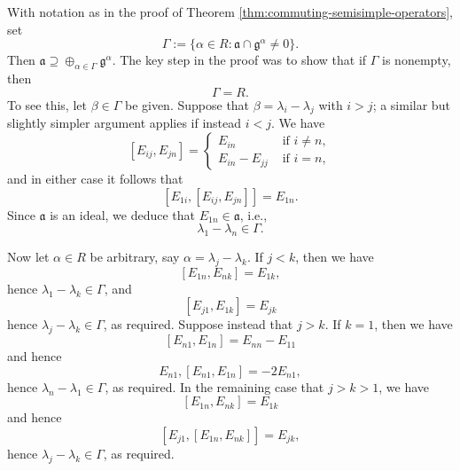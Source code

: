 \documentclass[reqno]{amsart} 
\begin{document}
With notation as in the proof of Theorem \ref{thm:commuting-semisimple-operators}, set 
\begin{equation*}
 \Gamma := \{\alpha \in R : \mathfrak{a} \cap \mathfrak{g}^\alpha \neq 0 \}.
\end{equation*}
Then $\mathfrak{a} \supseteq \oplus_{\alpha \in \Gamma} \mathfrak{g}^\alpha$.  The key step in the proof was to show that if $\Gamma$ is nonempty, then
\begin{equation}\label{eq:gamma-equals-R}
  \Gamma = R.
\end{equation}
To see this, let $\beta \in \Gamma$ be given.  Suppose that $\beta = \lambda_i - \lambda_j$ with $i > j$; a similar but slightly simpler argument applies if instead $i < j$.  We have
\begin{equation}
  {} [E_{i j}, E_{j n}]
  = 
\begin{cases}
    E_{i n} & \text{ if } i \neq n, \\
    E_{i n} - E_{j j} & \text{ if } i = n,
  \end{cases}
\end{equation}
and in either case it follows that
\begin{equation}
  {} [E_{1 i}, [E_{i j}, E_{j n}]]
  = E_{1 n}.
\end{equation}
Since $\mathfrak{a}$ is an ideal, we deduce that $E_{1 n} \in \mathfrak{a}$, i.e.,
\begin{equation}
  \lambda_1  - \lambda_n \in \Gamma.
\end{equation}

Now let $\alpha \in R$ be arbitrary, say $\alpha = \lambda_j - \lambda_k$.  If $j < k$, then we have
\begin{equation*}
  {} [E_{1 n}, E_{n k}] = E_{1 k},
\end{equation*}
hence $\lambda_1 - \lambda_k \in \Gamma$, and
\begin{equation*}
  {} [E_{j 1}, E_{1 k}]= E_{j k}
\end{equation*}
hence $\lambda_j - \lambda_k \in \Gamma$, as required.  Suppose instead that $j > k$.  If $k = 1$, then we have
\begin{equation*}
  {} [E_{n 1},E_{1 n}]
  = E_{n n} - E_{1 1}
\end{equation*}
and hence
\begin{equation*}
  {} E_{n 1},[E_{n 1},E_{1 n}]
  = - 2 E_{n 1},
\end{equation*}
hence $\lambda_n - \lambda_1 \in \Gamma$, as required.  In the remaining case that $j > k > 1$, we have
\begin{equation*}
  {} [E_{1 n}, E_{n k}]
  = E_{1 k}
\end{equation*}
and hence
\begin{equation*}
  {} [E_{j 1}, [E_{1 n}, E_{n k}]]
  = E_{j k},
\end{equation*}
hence $\lambda_j - \lambda_k \in \Gamma$, as required.
\end{document}
